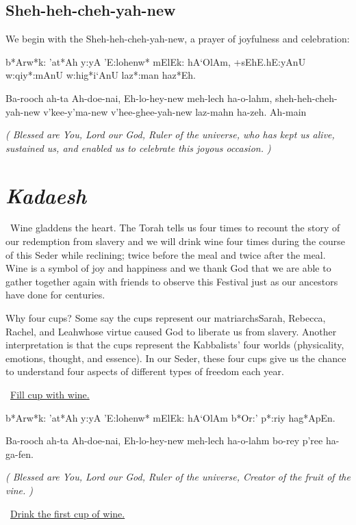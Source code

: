 \documentclass[12pt]{article}
\newenvironment{hebrewPrayer}
    {\begin{cjhebrew}
     \Large
    }
    {
    \end{cjhebrew}
    }
\newenvironment{hebrewTransliteration}{}{\par}
\newenvironment{unreadHebrewTranslation}{\itshape(\hspace{-0.2em}}{\hspace{-0.2em})\par}
\newcommand{\god}{God}
\newcommand{\hebrewVowelTL}{A} %
\newcommand{\hebrewVowelDotDotL}{e} %
\newcommand{\transliterateAdonai}{Ah-doe-nai}
\newcommand{\transliterateEloheinu}{Eh-lo-hey-new}
\newcommand{\baruchAdonai}{b*Arw*k: 'at*Ah y:yA}
\newcommand{\transliterateBaruchAdonai}{Ba-rooch ah-ta {\transliterateAdonai}}
\newcommand{\translateBaruchAdonai}{Blessed are You, Lord our \god}
\newcommand{\baruchHaolam}{{\baruchAdonai} 'E:loh{\hebrewVowelDotDotL}nw* mElEk: hA`OlAm}
\newcommand{\transliterateBaruchHaolam}{{\transliterateBaruchAdonai}, {\transliterateEloheinu} meh-lech ha-o-lahm}
\newcommand{\translateBaruchHaolam}{{\translateBaruchAdonai}, Ruler of the universe}
\newcommand{\baruchHagafen}{{\baruchHaolam} b*Or:' p*:riy hag*{\hebrewVowelTL}pEn}
\newcommand{\transliterateBaruchHagafen}{{\transliterateBaruchHaolam} bo-rey p'ree ha-ga-fen.}
\newcommand{\translateBaruchHagafen}{{\translateBaruchHaolam}, Creator of the fruit of the vine.}
\newcommand{\stepKadaeshEn}{Kadaesh}
\newcommand{\stepKadaeshHe}{qade+s}
\newcommand{\inlineSederAction}[1]{\faHandORight{}~\underline{#1}}
\newcommand{\sederAction}[1]{\inlineSederAction{#1}\par}
\newcommand{\sederSection}[2]{
    \section*{{\Huge \cjRL{#2}} \textit{#1}}
}
\newcommand{\newReading}{\faBook{}\ }
\begin{document}
\begin{minipage}[t]{\textwidth}
    \subsection*{Sheh-heh-cheh-yah-new}
    We begin with the Sheh-heh-cheh-yah-new, a prayer of joyfulness and celebration:

    \begin{hebrewPrayer}
        \baruchHaolam\textrm{,} +sEhE.hE:yAnU w:qiy*:mAnU w:hig*i`AnU laz*:man haz*Eh\textrm{.}
    \end{hebrewPrayer}

    \begin{hebrewTransliteration}
        {\transliterateBaruchHaolam}, sheh-heh-cheh-yah-new v'kee-y'ma-new v'hee-ghee-yah-new laz-mahn ha-zeh. Ah-main
    \end{hebrewTransliteration}
    \begin{unreadHebrewTranslation}
        {\translateBaruchHaolam}, who has kept us alive, sustained us, and enabled us to celebrate this joyous occasion.
    \end{unreadHebrewTranslation}
\end{minipage}
\sederSection{\stepKadaeshEn}{\stepKadaeshHe}
\newReading Wine gladdens the heart. The Torah tells us four times to recount the story of our redemption from slavery and we will drink wine four times during the course of this Seder while reclining; twice before the meal and twice after the meal. Wine is a symbol of joy and happiness and we thank \god{} that we are able to gather together again with friends to observe this Festival just as our ancestors have done for centuries.

Why four cups? Some say the cups represent our matriarchs\textemdash{}Sarah, Rebecca, Rachel, and Leah\textemdash{}whose virtue caused \god{} to liberate us from slavery. Another interpretation is that the cups represent the Kabbalists' four worlds (physicality, emotions, thought, and essence). In our Seder, these four cups give us the chance to understand four aspects of different types of freedom each year. %
{\wineSummaryThisYear}

{\wineFirstCup}

\sederAction{Fill cup with wine.}

\begin{minipage}[t]{\textwidth}
    \begin{hebrewPrayer}
        \baruchHagafen\textrm{.}
    \end{hebrewPrayer}

    \begin{hebrewTransliteration}
        {\transliterateBaruchHagafen}
    \end{hebrewTransliteration}

    \begin{unreadHebrewTranslation}
        {\translateBaruchHagafen}
    \end{unreadHebrewTranslation}

    \sederAction{Drink the first cup of wine.}
\end{minipage}
\end{document}
